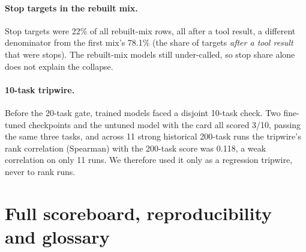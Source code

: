 \documentclass[11pt]{article}
\begin{document}
\paragraph{Stop targets in the rebuilt mix.} Stop targets were 22\% of all rebuilt-mix rows, all after a tool result, a different denominator from the first mix's 78.1\% (the share of targets \emph{after a tool result} that were stops). The rebuilt-mix models still under-called, so stop share alone does not explain the collapse.

\paragraph{10-task tripwire.} Before the 20-task gate, trained models faced a disjoint 10-task check. Two fine-tuned checkpoints and the untuned model with the card all scored 3/10, passing the same three tasks, and across 11 strong historical 200-task runs the tripwire's rank correlation (Spearman) with the 200-task score was 0.118, a weak correlation on only 11 runs. We therefore used it only as a regression tripwire, never to rank runs.

\section{Full scoreboard, reproducibility and glossary}
\label{app:runs}
\end{document}
